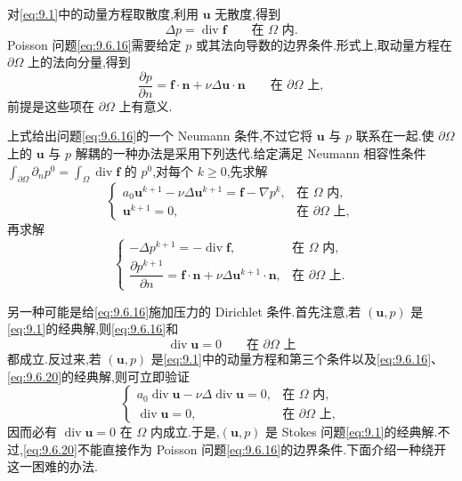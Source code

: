 对\eqref{eq:9.1}中的动量方程取散度,利用 \(\boldsymbol{u}\) 无散度,得到
\begin{equation}\label{eq:9.6.16}
  \Delta p=\operatorname{div}\boldsymbol{f}\qquad\text{在 }\Omega\text{ 内}.
\end{equation}
Poisson 问题\eqref{eq:9.6.16}需要给定 \(p\) 或其法向导数的边界条件.形式上,取动量方程在 \(\partial\Omega\) 上的法向分量,得到
\begin{equation}\label{eq:9.6.17}
  \frac{\partial p}{\partial n}=\boldsymbol{f}\cdot\boldsymbol{n}+\nu\Delta\boldsymbol{u}\cdot\boldsymbol{n}
          \qquad\text{在 }\partial\Omega\text{ 上},
\end{equation}
前提是这些项在 \(\partial\Omega\) 上有意义.

上式给出问题\eqref{eq:9.6.16}的一个 Neumann 条件,不过它将 \(\boldsymbol{u}\) 与 \(p\) 联系在一起.使 \(\partial\Omega\) 上的 \(\boldsymbol{u}\) 与 \(p\) 解耦的一种办法是采用下列迭代.给定满足 Neumann 相容性条件 \(\int_{\partial\Omega}\partial_np^0=\int_\Omega\operatorname{div}\boldsymbol{f}\) 的 \(p^0\),对每个 \(k\ge0\),先求解
\begin{equation}\label{eq:9.6.18}
  \begin{cases}
    a_0\boldsymbol{u}^{k+1}-\nu\Delta\boldsymbol{u}^{k+1}
       =\boldsymbol{f}-\nabla p^k,&\text{在 }\Omega\text{ 内},\\
    \boldsymbol{u}^{k+1}=0,&\text{在 }\partial\Omega\text{ 上},
  \end{cases}
\end{equation}
再求解
\begin{equation}\label{eq:9.6.19}
  \begin{cases}
    -\Delta p^{k+1}=-\operatorname{div}\boldsymbol{f},&\text{在 }\Omega\text{ 内},\\
    \dfrac{\partial p^{k+1}}{\partial n}
       =\boldsymbol{f}\cdot\boldsymbol{n}+\nu\Delta\boldsymbol{u}^{k+1}\cdot\boldsymbol{n},
       &\text{在 }\partial\Omega\text{ 上}.
  \end{cases}
\end{equation}

另一种可能是给\eqref{eq:9.6.16}施加压力的 Dirichlet 条件.首先注意,若 \((\boldsymbol{u},p)\) 是\eqref{eq:9.1}的经典解,则\eqref{eq:9.6.16}和
\begin{equation}\label{eq:9.6.20}
  \operatorname{div}\boldsymbol{u}=0\qquad\text{在 }\partial\Omega\text{ 上}
\end{equation}
都成立.反过来,若 \((\boldsymbol{u},p)\) 是\eqref{eq:9.1}中的动量方程和第三个条件以及\eqref{eq:9.6.16}、\eqref{eq:9.6.20}的经典解,则可立即验证
\[
  \begin{cases}
    a_0\operatorname{div}\boldsymbol{u}-\nu\Delta\operatorname{div}\boldsymbol{u}=0,
          &\text{在 }\Omega\text{ 内},\\
    \operatorname{div}\boldsymbol{u}=0,&\text{在 }\partial\Omega\text{ 上},
  \end{cases}
\]
因而必有 \(\operatorname{div}\boldsymbol{u}=0\) 在 \(\Omega\) 内成立.于是,\((\boldsymbol{u},p)\) 是 Stokes 问题\eqref{eq:9.1}的经典解.不过,\eqref{eq:9.6.20}不能直接作为 Poisson 问题\eqref{eq:9.6.16}的边界条件.下面介绍一种绕开这一困难的办法.

